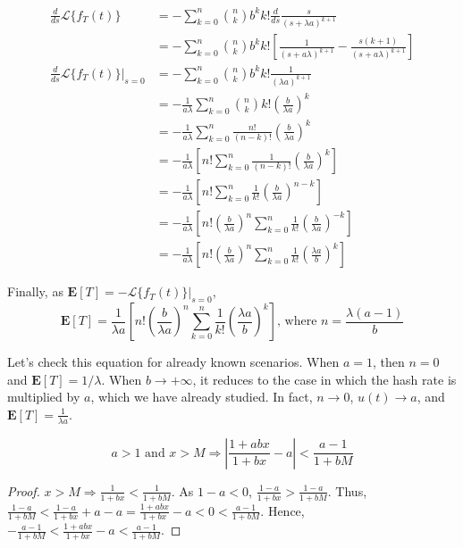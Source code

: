 \begin{align*}
\frac{d}{ds} \mathcal{L}\{f_T(t)\}
	&= - \sum_{k=0}^n \binom{n}{k} b^k k! \frac{d}{ds} \frac{s}{(s+\lambda a)^{k+1}} \\
	&= - \sum_{k=0}^n \binom{n}{k} b^k k! \left[ \frac{1}{(s+a\lambda)^{k+1}} - \frac{s(k+1)}{(s+a \lambda)^{k+1}} \right] \\
\frac{d}{ds} \mathcal{L}\{f_T(t)\}|_{s=0}
	&= - \sum_{k=0}^n \binom{n}{k} b^k k! \frac{1}{(\lambda a)^{k+1}} \\
	&= - \frac{1}{a\lambda} \sum_{k=0}^n \binom{n}{k} k! \left( \frac{b}{\lambda a} \right)^k \\
	&= - \frac{1}{a\lambda} \sum_{k=0}^n \frac{n!}{(n-k)!} \left( \frac{b}{\lambda a} \right)^k \\
	&= - \frac{1}{a\lambda} \left[ n! \sum_{k=0}^n \frac{1}{(n-k)!} \left( \frac{b}{\lambda a} \right)^k \right] \\
	&= - \frac{1}{a\lambda} \left[ n! \sum_{k=0}^n \frac{1}{k!} \left( \frac{b}{\lambda a} \right)^{n-k} \right] \tag{$k \rightarrow n-k$} \\
	&= - \frac{1}{a\lambda} \left[ n! \left(\frac{b}{\lambda a}\right)^n \sum_{k=0}^n \frac{1}{k!} \left( \frac{b}{\lambda a} \right)^{-k} \right] \\
	&= - \frac{1}{a\lambda} \left[ n! \left(\frac{b}{\lambda a}\right)^n \sum_{k=0}^n \frac{1}{k!} \left( \frac{\lambda a}{b} \right)^{k} \right]
\end{align*}

Finally, as $\mathbf{E}[T] = -\mathcal{L}\{f_T(t)\}|_{s=0}$,
$$\mathbf{E}[T] = \frac{1}{\lambda a} \left[ n! \left(\frac{b}{\lambda a}\right)^n \sum_{k=0}^n \frac{1}{k!} \left( \frac{\lambda a}{b} \right)^{k} \right] \text{, where $n = \frac{\lambda(a-1)}{b}$}$$

Let's check this equation for already known scenarios. When $a=1$, then $n=0$ and $\mathbf{E}[T] = 1/\lambda$. When $b \rightarrow +\infty$, it reduces to the case in which the hash rate is multiplied by $a$, which we have already studied. In fact, $n \rightarrow 0$, $u(t) \rightarrow a$, and $\mathbf{E}[T] = \frac{1}{\lambda a}$.

\begin{theorem}
	$$a > 1 \text{ and } x > M \Rightarrow \left| \frac{1+abx}{1+bx} - a \right| < \frac{a-1}{1+bM}$$
\end{theorem}
\begin{proof}
$x > M \Rightarrow \frac{1}{1+bx} < \frac{1}{1+bM}$. As $1-a<0$, $\frac{1-a}{1+bx} > \frac{1-a}{1+bM}$. Thus, $\frac{1-a}{1+bM} < \frac{1-a}{1+bx} + a - a = \frac{1+abx}{1+bx} - a < 0 < \frac{a-1}{1+bM}$. Hence, $-\frac{a-1}{1+bM} < \frac{1+abx}{1+bx} - a < \frac{a-1}{1+bM}$.
\end{proof}

